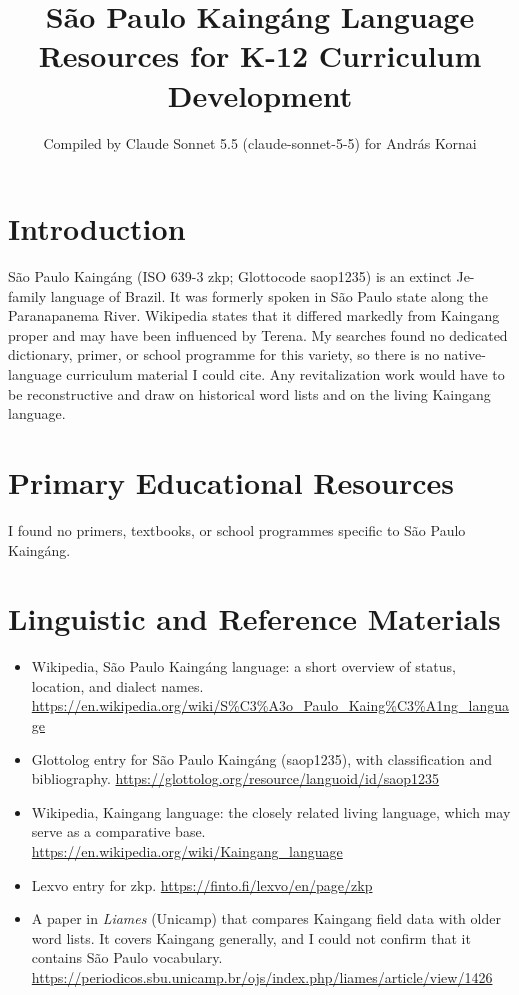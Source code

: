 \documentclass[12pt]{article}
\title{S\~ao Paulo Kaing\'ang Language Resources for K-12 Curriculum Development}
\author{Compiled by Claude Sonnet 5.5 (claude-sonnet-5-5) for Andr\'as Kornai}
\date{}
\begin{document}
\maketitle

\section{Introduction}
S\~ao Paulo Kaing\'ang (ISO 639-3 zkp; Glottocode saop1235) is an extinct Je-family language of Brazil. It was formerly spoken in S\~ao Paulo state along the Paranapanema River. Wikipedia states that it differed markedly from Kaingang proper and may have been influenced by Terena. My searches found no dedicated dictionary, primer, or school programme for this variety, so there is no native-language curriculum material I could cite. Any revitalization work would have to be reconstructive and draw on historical word lists and on the living Kaingang language.

\section{Primary Educational Resources}
I found no primers, textbooks, or school programmes specific to S\~ao Paulo Kaing\'ang.

\section{Linguistic and Reference Materials}
\begin{itemize}
\item Wikipedia, S\~ao Paulo Kaing\'ang language: a short overview of status, location, and dialect names. \url{https://en.wikipedia.org/wiki/S%C3%A3o_Paulo_Kaing%C3%A1ng_language}
\item Glottolog entry for S\~ao Paulo Kaing\'ang (saop1235), with classification and bibliography. \url{https://glottolog.org/resource/languoid/id/saop1235}
\item Wikipedia, Kaingang language: the closely related living language, which may serve as a comparative base. \url{https://en.wikipedia.org/wiki/Kaingang_language}
\item Lexvo entry for zkp. \url{https://finto.fi/lexvo/en/page/zkp}
\item A paper in \emph{Liames} (Unicamp) that compares Kaingang field data with older word lists. It covers Kaingang generally, and I could not confirm that it contains S\~ao Paulo vocabulary. \url{https://periodicos.sbu.unicamp.br/ojs/index.php/liames/article/view/1426}
\end{itemize}
\end{document}
